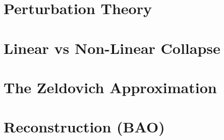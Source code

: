 \Huge

\section{Perturbation Theory}

\section{Linear vs Non-Linear Collapse}

\section{The Zeldovich Approximation}

\section{Reconstruction (BAO)}




